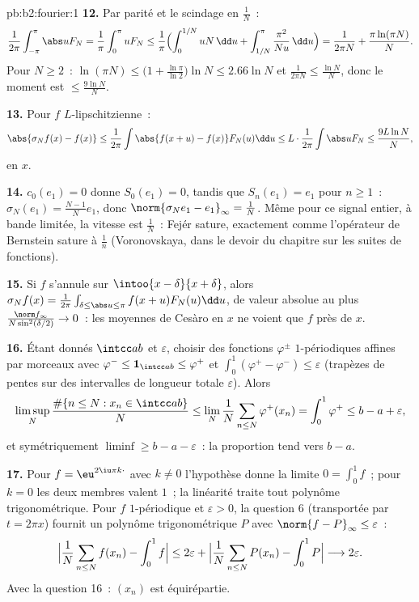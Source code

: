 \begin{solution}{pb:b2:fourier:1}
\textbf{12.} Par parité et le scindage en $\frac1N$~:
\[
\frac{1}{2\pi}\int_{-\pi}^{\pi}\abs uF_N
= \frac1\pi\int_0^\pi uF_N
\leq \frac1\pi\Bigl(\int_0^{1/N}uN\,\dd u +
\int_{1/N}^{\pi}\frac{\pi^2}{Nu}\,\dd u\Bigr)
= \frac{1}{2\pi N} + \frac{\pi\ln(\pi N)}{N} .
\]
Pour $N \geq 2$~: $\ln(\pi N) \leq \bigl(1 +
\frac{\ln\pi}{\ln2}\bigr)\ln N \leq 2.66\ln N$ et
$\frac{1}{2\pi N} \leq \frac{\ln N}{N}$, donc le moment est
$\leq \frac{9\ln N}{N}$.

\textbf{13.} Pour $f$ $L$-lipschitzienne~:
\[
\abs{\sigma_Nf(x) - f(x)}
\leq \frac{1}{2\pi}\int\abs{f(x+u) - f(x)}F_N(u)\dd u
\leq L\cdot\frac{1}{2\pi}\int\abs uF_N
\leq \frac{9L\ln N}{N},
\]
 en $x$.

\textbf{14.} $c_0(e_1) = 0$ donne $S_0(e_1) = 0$, tandis que
$S_n(e_1) = e_1$ pour $n \geq 1$~: $\sigma_N(e_1) =
\frac{N-1}{N}e_1$, donc $\norm{\sigma_Ne_1 - e_1}_\infty =
\frac1N$. Même pour ce signal entier, à bande limitée, la vitesse
est $\frac1N$~: Fejér sature, exactement comme l'opérateur de
Bernstein sature à $\frac1n$ (Voronovskaya, dans le devoir du
chapitre sur les suites de fonctions).

\textbf{15.} Si $f$ s'annule sur $\intoo{x-\delta}{x+\delta}$,
alors $\sigma_Nf(x) = \frac{1}{2\pi}\int_{\delta \leq \abs u
\leq \pi}f(x+u)F_N(u)\dd u$, de valeur absolue au plus
$\frac{\norm f_\infty}{N\sin^2(\delta/2)} \to 0$~: les moyennes de
Cesàro en $x$ ne voient que $f$ près de $x$.

\textbf{16.} Étant donnés $\intcc ab$ et $\varepsilon$, choisir des
fonctions $\varphi^\pm$  $1$-périodiques affines par
morceaux avec $\varphi^- \leq \mathbf 1_{\intcc ab} \leq \varphi^+$
et $\int_0^1(\varphi^+ - \varphi^-) \leq \varepsilon$ (trapèzes de
pentes sur des intervalles de longueur totale $\varepsilon$). Alors
\[
\limsup_N\frac{\#\{n \leq N : x_n \in \intcc ab\}}{N}
\leq \lim_N\frac1N\sum_{n\leq N}\varphi^+(x_n)
= \int_0^1\varphi^+ \leq b - a + \varepsilon ,
\]
et symétriquement $\liminf \geq b - a - \varepsilon$~: la
proportion tend vers $b - a$.

\textbf{17.} Pour $f = \eu^{2\iu\pi k\cdot}$ avec $k \neq 0$
l'hypothèse donne la limite $0 = \int_0^1f$~; pour $k = 0$ les deux
membres valent $1$~; la linéarité traite tout polynôme
trigonométrique. Pour $f$  $1$-périodique et $\varepsilon >
0$, la question 6 (transportée par $t = 2\pi x$) fournit un polynôme
trigonométrique $P$ avec $\norm{f - P}_\infty \leq \varepsilon$~:
\[
\Bigl|\frac1N\sum_{n\leq N}f(x_n) - \int_0^1f\Bigr|
\leq 2\varepsilon +
\Bigl|\frac1N\sum_{n\leq N}P(x_n) - \int_0^1P\Bigr|
\longrightarrow 2\varepsilon .
\]
Avec la question 16~: $(x_n)$ est équirépartie.


\end{solution}
